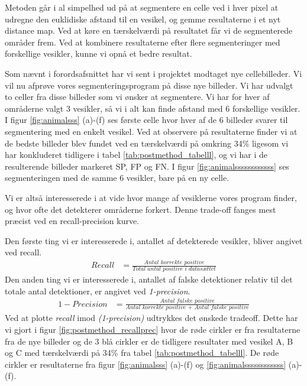 Metoden går i al simpelhed ud på at segmentere en celle ved i hver pixel at udregne den euklidiske afstand til en vesikel, og gemme resultaterne i et nyt distance map. Ved at køre en tærskelværdi på resultatet får vi de segmenterede områder frem. Ved at kombinere resultaterne efter flere segmenteringer med forskellige vesikler, kunne vi opnå et bedre resultat. 

Som nævnt i forordsafsnittet har vi sent i projektet modtaget nye cellebilleder. Vi vil nu afprøve vores segmenteringsprogram på disse nye billeder. Vi har udvalgt to celler fra disse billeder som vi ønsker at segmentere. Vi har for hver af områderne valgt 3 vesikler, så vi i alt kan finde afstand med 6 forskellige vesikler. I figur \ref{fig:animalsss} (a)-(f) ses første celle hvor hver af de 6 billeder svarer til segmentering med en enkelt vesikel. Ved at observere på resultaterne finder vi at de bedste billeder blev fundet ved en tærskelværdi på omkring 34\% ligesom vi har konkluderet tidligere i tabel \ref{tab:postmethod_tabelll}, og vi har i de resulterende billeder markeret SP, FP og FN. I figur \ref{fig:animalssssssssssss} ses segmenteringen med de samme 6 vesikler, bare på en ny celle.

Vi er altså interesserede i at vide hvor mange af vesiklerne vores program finder, og hvor ofte det detekterer områderne forkert. Denne trade-off fanges mest præcist ved en recall-precision kurve.

Den første ting vi er interesserede i, antallet af detekterede vesikler, bliver angivet ved recall. 
\begin{align}
	Recall &= \frac{\textit{Antal korrekte positive}}{\textit{Total antal positive i datasættet}}
\end{align}
Den anden ting vi er interesserede i, antallet af falske detektioner relativ til det totale antal detektioner, er angivet ved \emph{1-precision}.
\begin{align}
	1-Precision &= \frac{\textit{Antal falske positive}}{\textit{Antal korrekte positive + Antal falske positive}}
\end{align}
Ved at plotte \emph{recall} imod \emph{(1-precision)} udtrykkes det ønskede tradeoff. Dette har vi gjort i figur \ref{fig:postmethod_recallprec} hvor de røde cirkler er fra resultaterne fra de nye billeder og de 3 blå cirkler er de tidligere resultater med vesikel A, B og C med tærskelværdi på 34\% fra tabel \ref{tab:postmethod_tabelll}. De røde cirkler er resultaterne fra figur \ref{fig:animalsss} (a)-(f) og \ref{fig:animalssssssssssss} (a)-(f). 

